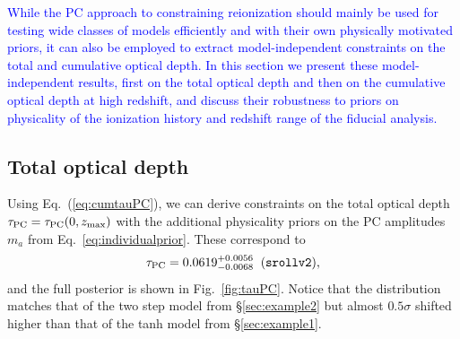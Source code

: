 \documentclass[prd,twocolumn,amsmath,amssymb,floatfix,superscriptaddress,nofootinbib]{revtex4-1}
\newcommand{\beq}{\begin{equation}}
\newcommand{\eeq}{\end{equation}}
\newcommand{\wh}[1]{\textcolor{blue}{#1}}
\begin{document}
\wh{
While the PC approach to constraining reionization should mainly be used for 
testing wide classes of models efficiently and with their own physically motivated priors, it can also be employed to extract model-independent constraints on the total and cumulative optical depth. 
In this section we present these model-independent results, first on the total optical depth and then on the cumulative optical depth at high redshift, and discuss their robustness to priors  on physicality of the ionization history and redshift range of the fiducial analysis.
}





\subsection{Total optical depth}

\label{sec:note_on_priors}


Using Eq.~(\ref{eq:cumtauPC}), we can derive constraints on the total optical
depth $\tau_{\rm PC}=\tau_{\rm PC}(0,z_{\rm max})$ with the additional physicality priors on the PC amplitudes $m_a$ from
Eq.~\ref{eq:individualprior}.  These 
correspond to 
\beq
\tau_{\rm PC} = 0.0619^{+0.0056}_{-0.0068} \;\; (\texttt{srollv2}),
\label{eq:tau_pc_zmax30}
\eeq  
and the full posterior is shown in Fig.~\ref{fig:tauPC}. 
Notice that the distribution matches that of the two step model from \S \ref{sec:example2} but almost $0.5\sigma$ shifted higher than that of the tanh model from \S \ref{sec:example1}.  
\end{document}
